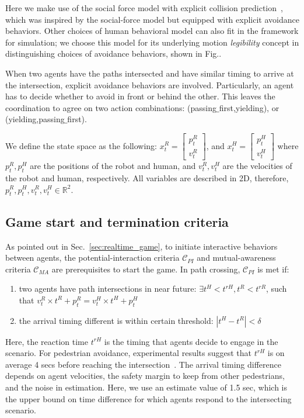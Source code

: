 \documentclass[letterpaper, 10 pt, conference]{ieeeconf}  %
\begin{document}
Here we make use of the social force model with explicit collision prediction~\cite{zanlungo2011social}, which was inspired by the 
social-force model but equipped with explicit avoidance behaviors. Other 
choices of human behavioral model can also fit in the framework for 
simulation; we choose this model for its underlying motion \textit{legibility} 
concept in distinguishing choices of avoidance behaviors, shown in Fig..  

When two agents have the paths intersected and have similar timing to arrive 
at the intersection, explicit avoidance behaviors are involved. Particularly, 
an agent has to decide whether to avoid in front or behind the other. This 
leaves the coordination to agree on two action combinations: (passing$\_$first,yielding), 
or (yielding,passing$\_$first).

We define the state space as the following: $x_t^R = \begin{bmatrix}
p^R_t\\
v^R_t
\end{bmatrix}$, and $x_t^H = \begin{bmatrix}
p^H_t\\
v^H_t
\end{bmatrix}$
where $p^R_t, p^H_t$ are the positions of the robot and human, and 
$v^R_t,v^H_t$ are the velocities of the robot and human, respectively. All 
variables are described in 2D, therefore, $p^R_t,p^H_t,v^R_t,v^H_t \in \mathbb{R}^2$. 
\subsection{Game start and termination criteria}
As pointed out in Sec.~\ref{sec:realtime_game}, to initiate interactive 
behaviors between agents, the potential-interaction criteria $\mathcal{C}_{PI}$ 
and mutual-awareness criteria $\mathcal{C}_{MA}$ are prerequisites to start the 
game. In path crossing, $\mathcal{C}_{PI}$ is met if:
\begin{enumerate}
  \item two agents have path intersections in near future: 
    $\exists t^H<t^{rH}, t^R<t^{rR}$, such that $v^R_t \times t^R + p^R_t = v^H_t \times t^H +p^H_t$
  \item the arrival timing different is within certain threshold: $|t^H-t^R|<\delta$
\end{enumerate}
Here, the reaction time $t^{rH}$ is the timing that agents decide to 
engage in the scenario. For pedestrian avoidance, experimental results suggest 
that $t^{rH}$ is on average 4 secs before reaching the intersection~\cite{pettre2009experiment}. 
The arrival timing difference depends on agent velocities, the safety margin 
to keep from other pedestrians, and the noise in estimation. Here, we use an 
estimate value of 1.5 sec, which is the upper bound on time difference for 
which agents respond to the intersecting scenario.
\end{document}
